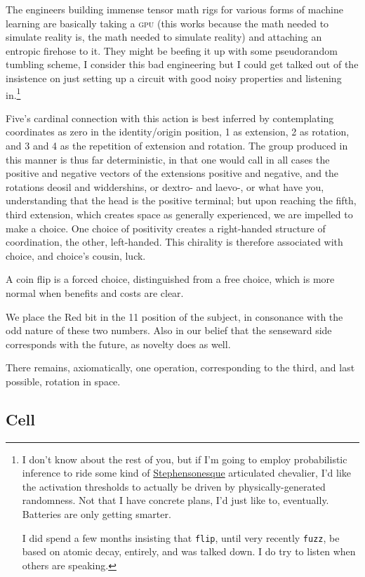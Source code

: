 \documentclass[twoside]{article}
\begin{document}
The engineers building immense tensor math rigs for various forms of machine learning are basically taking a \textsc{gpu} (this works because the math needed to simulate reality is, the math needed to simulate reality) and attaching an entropic firehose to it. They might be beefing it up with some pseudorandom tumbling scheme, I consider this bad engineering but I could get talked out of the insistence on just setting up a circuit with good noisy properties and listening in.\footnote{I don't know about the rest of you, but if I'm going to employ probabilistic inference to ride some kind of \href{https://en.wikipedia.org/wiki/The_Diamond_Age}{Stephensonesque} articulated chevalier, I'd like the activation thresholds to actually be driven by physically-generated randomness. Not that I have concrete plans, I'd just like to, eventually. Batteries are only getting smarter.

I did spend a few months insisting that \texttt{flip}, until very recently \texttt{fuzz}, be based on atomic decay, entirely, and was talked down. I do try to listen when others are speaking.}

Five's cardinal connection with this action is best inferred by contemplating coordinates as zero in the identity/origin position, 1 as extension, 2 as rotation, and 3 and 4 as the repetition of extension and rotation. The group produced in this manner is thus far deterministic, in that one would call in all cases the positive and negative vectors of the extensions positive and negative, and the rotations deosil and widdershins, or dextro- and laevo-, or what have you, understanding that the head is the positive terminal; but upon reaching the fifth, third extension, which creates space as generally experienced, we are impelled to make a choice. One choice of positivity creates a right-handed structure of coordination, the other, left-handed. This chirality is therefore associated with choice, and choice's cousin, luck.

A coin flip is a forced choice, distinguished from a free choice, which is more normal when benefits and costs are clear.

We place the Red bit in the 11 position of the subject, in consonance with the odd nature of these two numbers. Also in our belief that the senseward side corresponds with the future, as novelty does as well.

There remains, axiomatically, one operation, corresponding to the third, and last possible, rotation in space.

\subsection{Cell}
\end{document}
